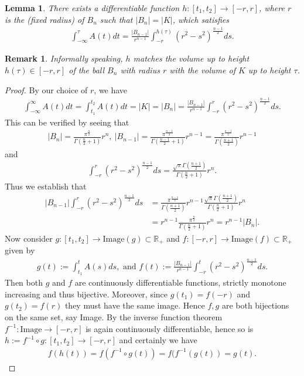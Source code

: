 \documentclass[12pt, a4paper, titlepage]{article}
\newtheorem{lemma}{Lemma}
\newtheorem{remark}{Remark}
\begin{document}
\begin{lemma} There exists a differentiable function $h: [t_1,t_2] \to [-r,r]$, where $r$ is the (fixed radius) of $B_n$ such that $|B_n|=|K|$, which satisfies
\begin{align*}
\int_{- \infty}^\tau A(t)dt = \frac{|B_{n-1}|}{r^{n-1}} \int_{-r}^{h( \tau)} (r^2-s^2)^{\frac{n-1}{2}} ds. 
\end{align*}
\end{lemma}
\begin{remark} Informally speaking, $h$ matches the volume up to height $h( \tau) \in [-r,r]$  of the ball $B_n$ with radius $r$ with the volume of $K$ up to height $\tau$. 
\end{remark}
\begin{proof}
By our choice of $r$, we have 
\begin{align*}
\int_{- \infty}^\infty A(t)dt = \int_{t_1}^{t_2} A(t)dt = |K|=|B_n| = \frac{|B_{n-1}|}{r^{n-1}} \int_{-r}^r (r^2-s^2)^\frac{n-1}{2}ds.
\end{align*}
This can be verified by seeing that 
\begin{align*}
|B_n| = \frac{\pi^\frac{n}{2}}{\Gamma \left( \frac{n}{2}+1\right)}r^n, \ |B_{n-1}| = \frac{\pi^\frac{n-1}{2}}{\Gamma \left( \frac{n-1}{2}+1\right)}r^{n-1} =\frac{\pi^\frac{n-1}{2}}{\Gamma \left( \frac{n+1}{2}\right)}r^{n-1} 
\end{align*}
and
\begin{align*}
\int_{-r}^r (r^2-s^2)^\frac{n-1}{2}ds = \frac{\sqrt{\pi}  \Gamma\left( \frac{n+1}{2}\right)}{\Gamma \left( \frac{n}{2}+1\right)}r^n.
\end{align*}
Thus we establish that 
\begin{align*}
|B_{n-1}| \int_{-r}^r (r^2-s^2)^\frac{n-1}{2}ds &= \frac{\pi^\frac{n-1}{2}}{\Gamma \left( \frac{n+1}{2}\right)}r^{n-1} \frac{\sqrt{\pi} \Gamma\left( \frac{n+1}{2}\right)}{\Gamma \left( \frac{n}{2}+1\right)}r^n \\
&= r^{n-1} \frac{\pi^\frac{n}{2}}{\Gamma \left( \frac{n}{2}+1\right)}r^n = r^{n-1}|B_n|.
\end{align*}
Now consider $g:[t_1,t_2] \to \text{Image}(g) \subset \mathbb{R}_+$ and $f:[-r,r] \to \text{Image}(f) \subset \mathbb{R}_+$ given by \begin{align*}
g(t):= \int_{t_1}^t A(s)ds, \text{ and } f(t):= \frac{|B_{n-1}|}{r^{n-1}} \int_{-r}^t (r^2-s^2)^\frac{n-1}{2}ds.
\end{align*}
Then both $g$ and $f$ are continuously differentiable functions, strictly monotone increasing and thus bijective. Moreover, since $g(t_1)=f(-r)$ and $g(t_2)=f(r)$ they must have the same image. Hence $f,g$ are both bijections on the same set, say Image. By the inverse function theorem $f^{-1}: \text{Image} \to [-r,r]$ is again continuously differentiable, hence so is $h:=f^{-1} \circ g : [t_1,t_2] \to [-r,r]$ and certainly we have 
\begin{align*}
f(h(t))=f(f^{-1} \circ g (t)) = f(f^{-1}(g(t))=g(t).
\end{align*}
\end{proof}
\end{document}
